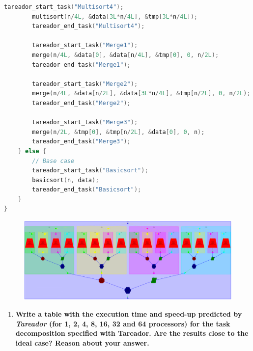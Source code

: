\documentclass[a4paper]{article}
\newenvironment{questionenum}{%
\setlist[enumerate]{resume}
\restartlist{enumerate}
\newcommand{\question}[1]{
\begin{enumerate}
	\item\bfseries ##1
\end{enumerate}
}}{%
}
\begin{document}
\begin{questionenum}
\begin{lstlisting}[language=C]
		tareador_start_task("Multisort4");
		multisort(n/4L, &data[3L*n/4L], &tmp[3L*n/4L]);
		tareador_end_task("Multisort4");
		
		tareador_start_task("Merge1");
		merge(n/4L, &data[0], &data[n/4L], &tmp[0], 0, n/2L);
		tareador_end_task("Merge1");
		
		tareador_start_task("Merge2");
		merge(n/4L, &data[n/2L], &data[3L*n/4L], &tmp[n/2L], 0, n/2L);
		tareador_end_task("Merge2");
		
		tareador_start_task("Merge3");
		merge(n/2L, &tmp[0], &tmp[n/2L], &data[0], 0, n);
		tareador_end_task("Merge3");
	} else {
		// Base case
		tareador_start_task("Basicsort");
		basicsort(n, data);
		tareador_end_task("Basicsort");
	}
}
\end{lstlisting}

\begin{figure}[H]
    \centering
    \includegraphics[width=\textwidth]{images/dependency_graph}
\end{figure}
	
	\question{Write a table with the execution time and speed-up predicted by \textit{Tareador} (for 1, 2, 4, 8, 16, 32 and 64 processors) for the task decomposition specified with Tareador. Are the results close to the ideal case? Reason about your answer.}
	

\end{questionenum}
\end{document}
